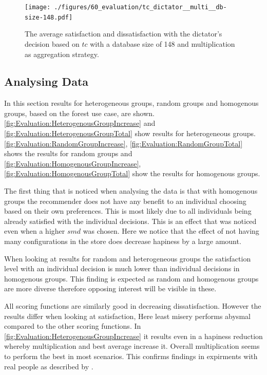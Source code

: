 \begin{figure}
    \centering
    \texttt{[image: ./figures/60\_evaluation/tc\_dictator\_\_multi\_\_db-size-148.pdf]}
    \caption{The average satisfaction and dissatisfaction with the dictator's decision based on $tc$ with a database size of 148 and multiplication as aggregation strategy.}
    \label{fig:Evaluation:tcCount}
\end{figure}

\subsection{Analysing Data}

In this section results for heterogeneous groups, random groups and homogenous groups, based on the forest use case, are shown. \autoref{fig:Evaluation:HeterogenousGroupIncrease} and \autoref{fig:Evaluation:HeterogenousGroupTotal} show results for heterogeneous groups. \autoref{fig:Evaluation:RandomGroupIncrease}, \autoref{fig:Evaluation:RandomGroupTotal} shows the results for random groups and \autoref{fig:Evaluation:HomogenousGroupIncrease}, \autoref{fig:Evaluation:HomogenousGroupTotal} show the results for homogenous groups.

The first thing that is noticed when analysing the data is that with homogenous groups the recommender does not have any benefit to an individual choosing based on their own preferences. This is most likely due to all individuals being already satisfied with the individual decisions. This is an effect that was noticed even when a higher $smd$ was chosen. Here we notice that the effect of not having many configurations in the store does decrease hapiness by a large amount.

When looking at results for random and heterogeneous groups the satisfaction level with an individual decision is much lower than individual decisions in homogenous groups. This finding is expected as random and homogenous groups are more diverse therefore opposing interest will be visible in these.

All scoring functions are similarly good in decreasing dissatisfaction. However the results differ when looking at satisfaction, Here least misery performs abysmal compared to the other scoring functions. In \autoref{fig:Evaluation:HeterogenousGroupIncrease} it results even in a hapiness reduction whereby multiplication and best average increase it. Overall multiplication seems to perform the best in most scenarios. This confirms findings in expirments with real people as described by \citeauthor{Masthoff2015} \cite[p. 755f]{Masthoff2015}.

